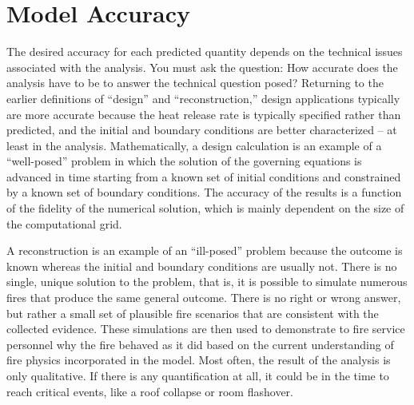 \section{Model Accuracy}

The desired accuracy for each predicted quantity depends on the  technical  issues  associated with  the
analysis.  You must ask the question: How accurate does  the analysis have to
be  to  answer  the  technical  question posed?  
Returning   to    the   earlier   definitions    of   ``design''   and
``reconstruction,''  design applications  typically are  more accurate
because the heat release rate is typically specified rather than predicted, and
the    initial    and    boundary    conditions   are    better
characterized -- at least in the analysis. Mathematically, a design calculation is an example of a
``well-posed''  problem  in  which   the  solution  of  the  governing
equations is  advanced in  time starting from  a known set  of initial
conditions and constrained by a known set of boundary conditions.  The
accuracy of the results is a function of the fidelity of the numerical
solution, which is  mainly dependent on the size  of the computational
grid. 

A reconstruction is an example of an ``ill-posed'' problem because the
outcome  is known  whereas  the initial  and  boundary conditions  are usually
not. There is  no single, unique solution to the  problem, that is, it
is possible to simulate numerous fires that produce the same general outcome.
There is no right or wrong answer, but rather a small set of plausible
fire scenarios that are  consistent with the collected evidence. These
simulations are then used to demonstrate to fire service personnel why
the fire behaved as it did  based on the current understanding of fire
physics  incorporated in  the model.  Most  often, the  result of  the
analysis is only  qualitative. If there is any  quantification at all,
it could be in the time to reach critical events, like a roof collapse
or room flashover.
